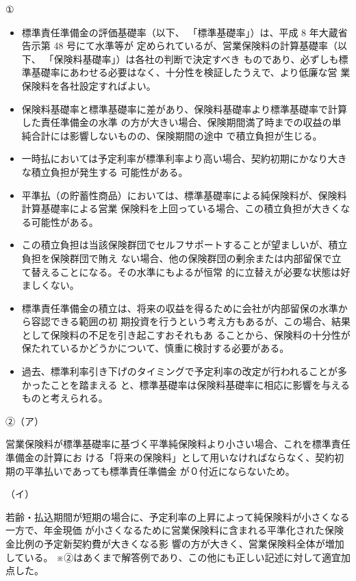 \documentclass[report,gutter=10mm,fore-edge=10mm,uplatex,dvipdfmx]{jlreq}
\begin{document}
①
\begin{itemize}
 \item  標準責任準備金の評価基礎率（以下、
 「標準基礎率」）は、平成 8 年大蔵省告示第 48 号にて水準等が
 定められているが、営業保険料の計算基礎率（以下、
 「保険料基礎率」）は各社の判断で決定すべき
 ものであり、必ずしも標準基礎率にあわせる必要はなく、十分性を検証したうえで、より低廉な営
 業保険料を各社設定すればよい。
 \item  保険料基礎率と標準基礎率に差があり、保険料基礎率より標準基礎率で計算した責任準備金の水準
 の方が大きい場合、保険期間満了時までの収益の単純合計には影響しないものの、保険期間の途中
 で積立負担が生じる。
 \item  一時払においては予定利率が標準利率より高い場合、契約初期にかなり大きな積立負担が発生する
 可能性がある。
 \item  平準払（の貯蓄性商品）においては、標準基礎率による純保険料が、保険料計算基礎率による営業
 保険料を上回っている場合、この積立負担が大きくなる可能性がある。
 \item  この積立負担は当該保険群団でセルフサポートすることが望ましいが、積立負担を保険群団で賄え
 ない場合、他の保険群団の剰余または内部留保で立て替えることになる。その水準にもよるが恒常
 的に立替えが必要な状態は好ましくない。
 \item  標準責任準備金の積立は、将来の収益を得るために会社が内部留保の水準から容認できる範囲の初
 期投資を行うという考え方もあるが、この場合、結果として保険料の不足を引き起こすおそれもあ
 ることから、保険料の十分性が保たれているかどうかについて、慎重に検討する必要がある。
 \item  過去、標準利率引き下げのタイミングで予定利率の改定が行われることが多かったことを踏まえる
 と、標準基礎率は保険料基礎率に相応に影響を与えるものと考えられる。
\end{itemize}

②（ア）

営業保険料が標準基礎率に基づく平準純保険料より小さい場合、これを標準責任準備金の計算にお
ける「将来の保険料」として用いなければならなく、契約初期の平準払いであっても標準責任準備金
が０付近にならないため。

（イ）

若齢・払込期間が短期の場合に、予定利率の上昇によって純保険料が小さくなる一方で、年金現価
が小さくなるために営業保険料に含まれる平準化された保険金比例の予定新契約費が大きくなる影
響の方が大きく、営業保険料全体が増加している。
※②はあくまで解答例であり、この他にも正しい記述に対して適宜加点した。

\end{document}
